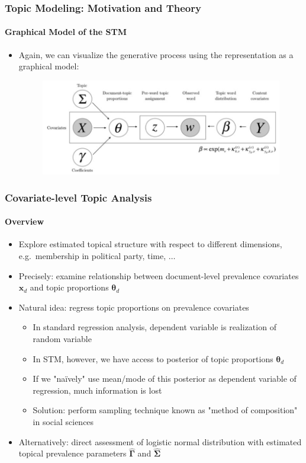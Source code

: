 \documentclass[xcolor=dvipsnames]{beamer}
\begin{document}
\begin{frame}
\frametitle{Topic Modeling: Motivation and Theory}
\framesubtitle{Graphical Model of the STM}
\begin{itemize}
\item Again, we can visualize the generative process using the representation as a graphical model:
\begin{figure}[h!]
\centering
\hspace*{-1cm}\includegraphics[scale = 0.3]{../../plots/presentation/stm_graphical.png}
\end{figure}
\end{itemize}
\end{frame}

\begin{frame}
\frametitle{Covariate-level Topic Analysis}
\framesubtitle{Overview}
\begin{itemize}
\item Explore estimated topical structure with respect to different dimensions, e.g.\ membership in political party, time, $\dots$
\item Precisely: examine relationship between document-level prevalence covariates $\boldsymbol{x}_d$ and topic proportions $\boldsymbol{\theta}_d$
\item Natural idea: regress topic proportions on prevalence covariates
\begin{itemize}
\item In standard regression analysis, dependent variable is realization of random variable
\item In STM, however, we have access to posterior of topic proportions $\boldsymbol{\theta}_d$
\item If we "na{\"i}vely" use mean/mode of this posterior as dependent variable of regression, much information is lost
\item Solution: perform sampling technique known as "method of composition" in social sciences
\end{itemize}
\item Alternatively: direct assessment of logistic normal distribution with estimated topical prevalence parameters $\hat{\boldsymbol{\Gamma}}$ and $\hat{\boldsymbol{\Sigma}}$
\end{itemize}
\end{frame}
\end{document}
